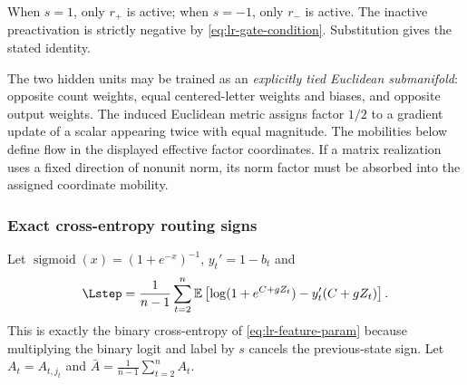 When $s=1$, only $r_+$ is active; when $s=-1$, only $r_-$ is active.
The inactive preactivation is strictly negative by
\eqref{eq:lr-gate-condition}.  Substitution gives the stated identity.

The two hidden units may be trained as an \emph{explicitly tied Euclidean
submanifold}: opposite count weights, equal centered-letter weights and
biases, and opposite output weights.  The induced Euclidean metric assigns
factor $1/2$ to a gradient update of a scalar appearing twice with equal
magnitude.  The mobilities below define flow in the displayed effective factor coordinates.
If a matrix realization uses a fixed direction of nonunit norm, its norm
factor must be absorbed into the assigned coordinate mobility.

\subsubsection{Exact cross-entropy routing signs}
\label{app:weak-routing-signs}

Let $\operatorname{sigmoid}(x)=(1+e^{-x})^{-1}$, $y_t'=1-b_t$ and
\begin{equation}\label{eq:lr-logistic-risk}
 \Lstep=\frac1{n-1}\sum_{t=2}^n\mathbb E
 \left[\log(1+e^{C+gZ_t})-y_t'(C+gZ_t)\right].
\end{equation}
This is exactly the binary cross-entropy of
\eqref{eq:lr-feature-param} because multiplying the binary logit and
label by $s$ cancels the previous-state sign.
Let $A_t=A_{t,j_t}$ and $\bar A=\frac1{n-1}\sum_{t=2}^n A_t$.

